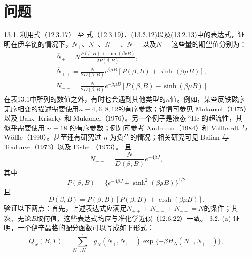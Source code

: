 \section{问题}\label{ux95eeux9898_chap13}
13.1. 利用式（12.3.17） 至 式（12.3.19）、(13.2.12)以及(13.2.13)中的表达式，证明在伊辛链的情况下，\(N_{+}\)、\(N_{-}\)、\(N_{++}\)、\(N_{--}\)以及\(N_{+-}\)这些量的期望值分别为：
\begin{equation}\tag{13.7.11}\label{eq:13.7.11}
\begin{array}{rlr} & { } & { \overline { { N } } _ { \pm } = N \frac { P ( \beta , B ) \pm \sinh ( \beta \mu B ) } { 2 P ( \beta , B ) } , } \\& { } & { \overline { { N } } _ { + + } = \frac { N } { 2 D ( \beta , B ) } e ^{\beta \mu B} [ P ( \beta , B ) + \sinh ( \beta \mu B ) ] , } \\& { } & { \overline { { N } } _ { -- } = \frac { N } { 2 D ( \beta , B ) } e ^{- \beta \mu B} [ P ( \beta , B ) - \sinh ( \beta \mu B ) ] } \end{array}
\end{equation}
在表13.1中所列的数值之外，有时也会遇到其他类型的\(n\)值。例如，某些反铁磁序-无序相变的描述需要使用\(n=4,6,8,12\)的有序参数；详情可参见 Mukamel（1975）以及 Bak、Krisnky 和 Mukamel（1976）。另一个例子是液态 \(^3\mathrm{He}\) 的超流性，其似乎需要使用 \(n=18\) 的有序参数；例如可参考 Anderson（1984）和 Vollhardt 与 Wölfle（1990）。甚至还有研究过 \(n\) 为负值的情况；相关研究可见 Balian 与 Toulouse（1973）以及 Fisher（1973）。
且
\begin{equation}\tag{13.7.12}\label{eq:13.7.12}
\overline { { N } } _ { + - } = \frac { N } { D ( \beta , B ) } e ^{- 4 \beta J} ,
\end{equation}
其中
\begin{equation}\tag{13.7.13}\label{eq:13.7.13}
P ( \beta , B ) = \{ e ^{- 4 \beta J} + \sinh ^{2} ( \beta \mu B ) \} ^{1 / 2}
\end{equation}
且
\begin{equation}\tag{13.7.14}\label{eq:13.7.14}
D ( \beta , B ) = P ( \beta , B ) [ P ( \beta , B ) + \cosh ( \beta \mu B ) ] .
\end{equation}
验证以下两点：首先，上述表达式应满足\(\overline{N}_{++}+\overline{N}_{--}+\overline{N}_{+-}=N\)的条件；其次，无论\(B\)取何值，这些表达式均应与准化学近似（12.6.22）一致。
3.2. (a) 证明，一个伊辛晶格的配分函数可以写成如下形式：
\begin{equation}\tag{13.7.15}\label{eq:13.7.15}
Q _ { N } ( B , T ) = \sum _ { N _ { + } , N _ { + - } } ^{'} g _ { N } ( N _ { + } , N _ { + - } ) \exp \{ - \beta H _ { N } ( N _ { + } , N _ { + - } ) \} ,
\end{equation}
